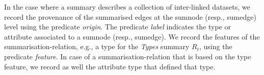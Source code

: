 In the case where a summary describes a collection of inter-linked datasets, we record the provenance of the summarised edges at the sumnode (resp., sumedge) level using the predicate \emph{origin}. The predicate \emph{label} indicates the type or attribute associated to a sumnode (resp., sumedge). We record the features of the \gls{summarisation-relation}, e.g., a type for the \emph{Types} summary $R_t$, using the predicate \emph{feature}. In case of a \gls{summarisation-relation} that is based on the type feature, we record as well the attribute type that defined that type.



